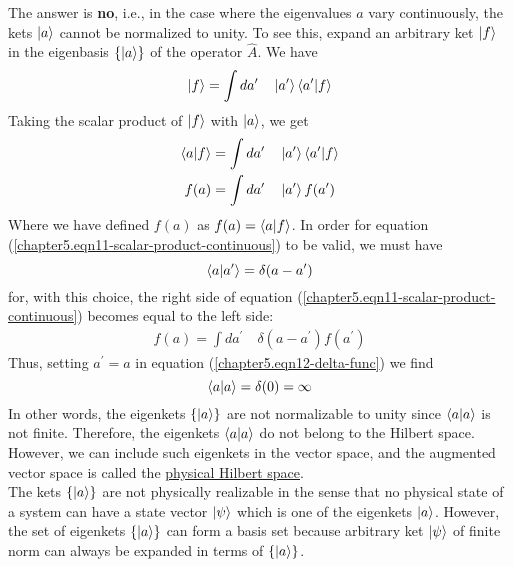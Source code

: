 		The answer is \textbf{no}, i.e., in the case where the eigenvalues $a$ vary continuously, the kets $\ket{a}$ cannot be normalized to unity. To see this, expand an arbitrary ket $\ket{f}$ in the eigenbasis $\{\ket{a}\}$ of the operator $\hat{A}$. We have
		\begin{equation}
			\ket{f} = \int da^\prime \quad \ket{a^\prime}\braket{a^\prime}{f}
			\label{chapter5.eqn10-expansion-continuous}
		\end{equation}
		Taking the scalar product of $\ket{f}$ with $\ket{a}$, we get
		\begin{eqnarray}
		\braket{a}{f} 
		&= \int da^\prime \quad \ket{a^\prime}\braket{a^\prime}{f} \nonumber \\
		f(a) &= \int da^\prime \quad \ket{a^\prime}f(a^\prime)
		\label{chapter5.eqn11-scalar-product-continuous}
		\end{eqnarray}
		Where we have defined $f(a)$ as $f(a) = \braket{a}{f}$. In order for equation (\ref{chapter5.eqn11-scalar-product-continuous}) to be valid, we must have
		\begin{equation}
			\braket{a}{a^\prime} = \delta(a-a^\prime)
			\label{chapter5.eqn12-delta-func}
		\end{equation}
		for, with this choice, the right side of equation (\ref{chapter5.eqn11-scalar-product-continuous}) becomes equal to the left side:
		\begin{eqnarray}
			f(a) = \int da^\prime \quad \delta(a-a^\prime) f(a^\prime)
		\end{eqnarray}
		Thus, setting $a^\prime = a$ in equation (\ref{chapter5.eqn12-delta-func}) we find
		\begin{equation}
			\braket{a}{a} = \delta(0) = \infty
		\end{equation}
		In other words, the eigenkets $\{\ket{a}\}$ are not normalizable to unity since $\braket{a}{a}$ is not finite. Therefore, the eigenkets $\braket{a}{a}$ do not belong to the Hilbert space. However, we can include such eigenkets in the vector space, and the augmented vector space is called the \underline{physical Hilbert space}.\\
		
		The kets $\{\ket{a}\}$  are not physically realizable in the sense that no physical state of a system can have a state vector $\ket{\psi}$ which is one of the eigenkets $\ket{a}$. However, the set of eigenkets $\{\ket{a}\}$ can form a basis set because arbitrary ket $\ket{\psi}$ of finite norm can always be expanded in terms of $\{\ket{a}\}$.\\
		

